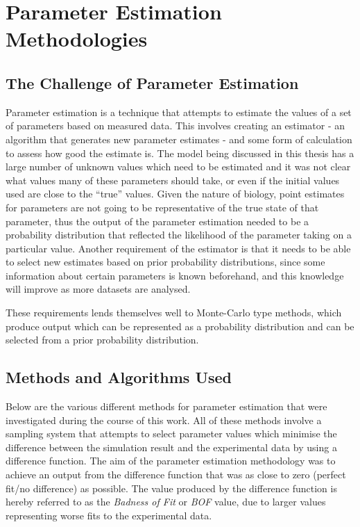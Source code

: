 \chapter{Parameter Estimation Methodologies}
\label{chap:paramest}

\section{The Challenge of Parameter Estimation}
Parameter estimation is a technique that attempts to estimate the values of a set of parameters based on measured data. This involves creating an estimator - an algorithm that generates new parameter estimates - and some form of calculation to assess how good the estimate is. The model being discussed in this thesis has a large number of unknown values which need to be estimated and it was not clear what values many of these parameters should take, or even if the initial values used are close to the ``true'' values. Given the nature of biology, point estimates for parameters are not going to be representative of the true state of that parameter, thus the output of the parameter estimation needed to be a probability distribution that reflected the likelihood of the parameter taking on a particular value. Another requirement of the estimator is that it needs to be able to select new estimates based on prior probability distributions, since some information about certain parameters is known beforehand, and this knowledge will improve as more datasets are analysed.

These requirements lends themselves well to Monte-Carlo type methods, which produce output which can be represented as a probability distribution and can be selected from a prior probability distribution.

\section{Methods and Algorithms Used}
Below are the various different methods for parameter estimation that were investigated during the course of this work. All of these methods involve a sampling system that attempts to select parameter values which minimise the difference between the simulation result and the experimental data by using a difference function. The aim of the parameter estimation methodology was to achieve an output from the difference function that was as close to zero (perfect fit/no difference) as possible. The value produced by the difference function is hereby referred to as the \textit{Badness of Fit} or \textit{BOF} value, due to larger values representing worse fits to the experimental data.

